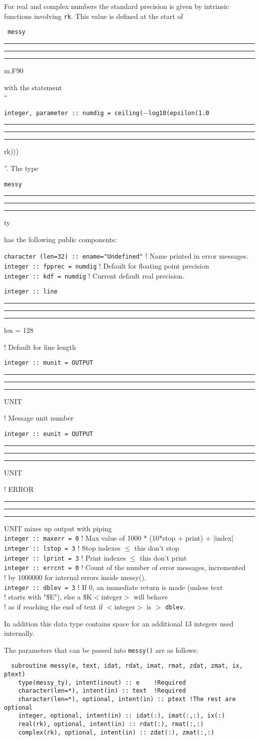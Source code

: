 \documentclass[12pt]{article}
\DeclareRobustCommand{\us}{\rule{.2pt}{0pt}\rule[-.8pt]{.4em}{.5pt}%
  \rule{.2pt}{0pt}}
\DeclareRobustCommand{\us}{\rule{.2pt}{0pt}\rule[-.8pt]{.4em}{.5pt}%
  \rule{.2pt}{0pt}}
\begin{document}
For real and complex numbers the standard precision is given by intrinsic
functions involving {\tt rk}.  This value is defined at the start of {\tt
  messy\us m.F90} with the statement\\``{\tt integer, parameter :: numdig =
  ceiling($-$log10(epsilon(1.0\us
  rk)))}''.  The type {\tt messy\us ty} has the following public components:
\begin{tabbing}
  {\tt character (len=32) :: ename="Undefined"} ! Name printed in error
  messages.\\
  {\tt integer :: fpprec = numdig} ! Default for floating point precision\\
  {\tt integer :: kdf = numdig} ! Current default real precision.\\
  {\tt integer :: line\us len = 128} ! Default for line length\\
  {\tt integer :: munit = OUTPUT\us UNIT} ! Message unit number\\
  {\tt integer :: eunit = OUTPUT\us UNIT} ! ERROR\us UNIT mixes up output with
  piping\\
  {\tt integer :: maxerr = 0} ! Max value of 1000 * (10*stop + print) +
  |index|\\
  {\tt integer :: lstop = 3} ! Stop indexes $\leq$ this don't stop\\
  {\tt integer :: lprint = 3} ! Print indexes $\leq$ this don't print\\
  {\tt integer :: errcnt = 0} ! Count of the number of error messages,
  incremented\\
  ! \hspace{1.5in}by 1000000 for internal errors inside messy().\\
  {\tt integer :: dblev = 3} ! If 0, an immediate return is made (unless text\\
  ! \hspace{1.5in}starts with "\$E"), else a \$K$<$integer$>$ will behave\\
  ! \hspace{1.5in}as if reaching the end of text if $<$integer$>$ is
  $>$ {\tt dblev}.\\
\end{tabbing}\vspace{-10pt}
In addition this data type contains space for an additional 13 integers used
internally.


The parameters that can be passed into {\tt messy()} are as follows:
\begin{verbatim}
  subroutine messy(e, text, idat, rdat, imat, rmat, zdat, zmat, ix, ptext) 
    type(messy_ty), intent(inout) :: e    !Required
    character(len=*), intent(in) :: text  !Required
    character(len=*), optional, intent(in) :: ptext !The rest are optional
    integer, optional, intent(in) :: idat(:), imat(:,:), ix(:)
    real(rk), optional, intent(in) :: rdat(:), rmat(:,:)
    complex(rk), optional, intent(in) :: zdat(:), zmat(:,:)
\end{verbatim}
\end{document}
